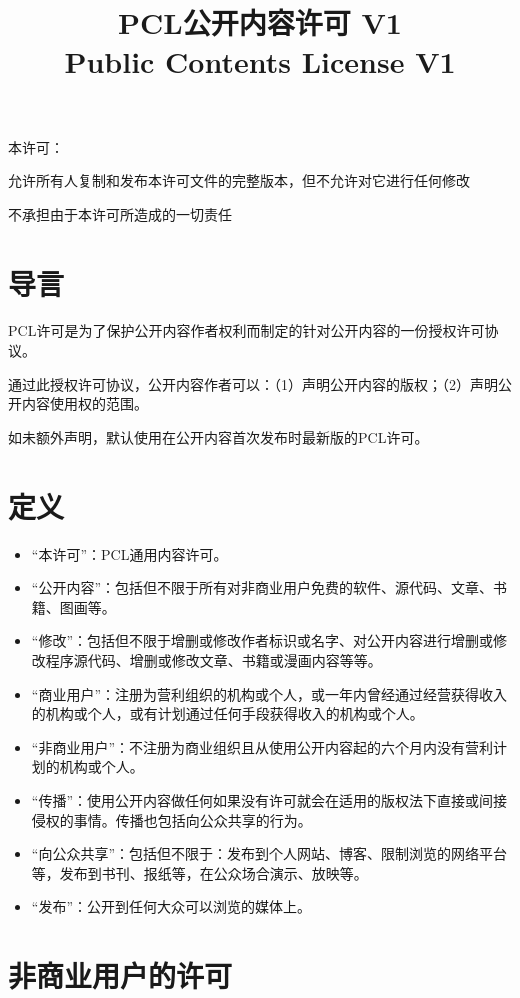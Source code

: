 \documentclass[utf-8,12pt]{ctexart}%
\title{\textbf{PCL公开内容许可 V1}\\\normalsize{Public Contents License V1}}
\begin{document}
\maketitle
\tableofcontents
\pagestyle{fancy}
\newpage{}
\paragraph{}
\noindent 本许可：

允许所有人复制和发布本许可文件的完整版本，但不允许对它进行任何修改

不承担由于本许可所造成的一切责任
\section{导言}
PCL许可是为了保护公开内容作者权利而制定的针对公开内容的一份授权许可协议。

通过此授权许可协议，公开内容作者可以：（1）声明公开内容的版权；（2）声明公开内容使用权的范围。

如未额外声明，默认使用在公开内容首次发布时最新版的PCL许可。
\section{定义}
\begin{itemize}
\item “本许可”：PCL通用内容许可。
\item “公开内容”：包括但不限于所有对非商业用户免费的软件、源代码、文章、书籍、图画等。
\item “修改”：包括但不限于增删或修改作者标识或名字、对公开内容进行增删或修改程序源代码、增删或修改文章、书籍或漫画内容等等。
\item “商业用户”：注册为营利组织的机构或个人，或一年内曾经通过经营获得收入的机构或个人，或有计划通过任何手段获得收入的机构或个人。
\item “非商业用户”：不注册为商业组织且从使用公开内容起的六个月内没有营利计划的机构或个人。
\item “传播”：使用公开内容做任何如果没有许可就会在适用的版权法下直接或间接侵权的事情。传播也包括向公众共享的行为。
\item “向公众共享”：包括但不限于：发布到个人网站、博客、限制浏览的网络平台等，发布到书刊、报纸等，在公众场合演示、放映等。
\item “发布”：公开到任何大众可以浏览的媒体上。
\end{itemize}
\section{非商业用户的许可}
\end{document}

